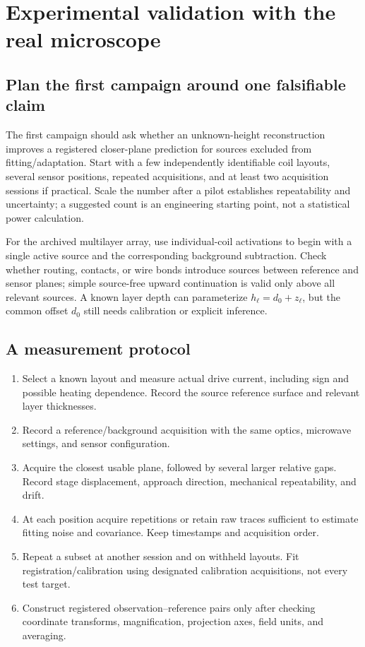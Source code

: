 \section{Experimental validation with the real microscope}
\label{sec:real}
\subsection{Plan the first campaign around one falsifiable claim}
The first campaign should ask whether an unknown-height reconstruction improves a registered closer-plane prediction for sources excluded from fitting/adaptation. Start with a few independently identifiable coil layouts, several sensor positions, repeated acquisitions, and at least two acquisition sessions if practical. Scale the number after a pilot establishes repeatability and uncertainty; a suggested count is an engineering starting point, not a statistical power calculation.

For the archived multilayer array, use individual-coil activations to begin with a single active source and the corresponding background subtraction. Check whether routing, contacts, or wire bonds introduce sources between reference and sensor planes; simple source-free upward continuation is valid only above all relevant sources. A known layer depth can parameterize $h_\ell=d_0+z_\ell$, but the common offset $d_0$ still needs calibration or explicit inference.

\subsection{A measurement protocol}
\begin{enumerate}
\item Select a known layout and measure actual drive current, including sign and possible heating dependence. Record the source reference surface and relevant layer thicknesses.
\item Record a reference/background acquisition with the same optics, microwave settings, and sensor configuration.
\item Acquire the closest usable plane, followed by several larger relative gaps. Record stage displacement, approach direction, mechanical repeatability, and drift.
\item At each position acquire repetitions or retain raw traces sufficient to estimate fitting noise and covariance. Keep timestamps and acquisition order.
\item Repeat a subset at another session and on withheld layouts. Fit registration/calibration using designated calibration acquisitions, not every test target.
\item Construct registered observation--reference pairs only after checking coordinate transforms, magnification, projection axes, field units, and averaging.
\end{enumerate}

